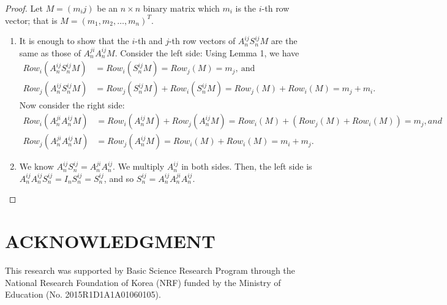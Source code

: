 \myprop*
\begin{proof}
Let $ M=(m_ij ) $ be an $ n\times n $ binary matrix which $ m_i $ is the $ i $-th row vector; that is $ M=(m_1,m_2,…,m_n )^T $.
\begin{enumerate}
	\item It is enough to show that the $ i $-th and $ j $-th row vectors of $ A_n^{ij} S_n^{ij} M $ are the same as those of $ A_n^{ji} A_n^{ij}  M $. Consider the left side: Using Lemma 1, we have 
	\begin{align*}
	Row_i (A_n^{ij} S_n^{ij} M)&=Row_i (S_n^{ij} M)=Row_j (M)=m_j,\ \text{and}\\
	Row_j (A_n^{ij} S_n^{ij} M)&=Row_j (S_n^{ij} M)+Row_i (S_n^{ij} M)=Row_j (M)+Row_i (M)=m_j+m_i .
	\end{align*}
	Now consider the right side:
	\begin{align*}
	Row_i (A_n^{ji} A_n^{ij} M)&=Row_i (A_n^{ij} M)+Row_j (A_n^{ij} M)=Row_i (M)+(Row_j (M)+Row_i (M))=m_j, and \\
	Row_j (A_n^{ji} A_n^{ij} M)&=Row_j (A_n^{ij} M)=Row_i (M)+Row_i (M) = m_i+m_j .
\end{align*}
	\item 	We know $ A_n^{ij} S_n^{ij} = A_n^{ji} A_n^{ij} $. We multiply $ A_n^{ij} $ in both sides. Then, the left side is $ A_n^{ij} A_n^{ij} S_n^{ij}=I_n S_n^{ij}=S_n^{ij} $, and so $ S_n^{ij}=A_n^{ij} A_n^{ji} A_n^{ij} $.
\end{enumerate}
\end{proof}

\section*{ACKNOWLEDGMENT}
This research was supported by Basic Science Research Program through the National Research Foundation of Korea (NRF) funded by the Ministry of Education (No. 2015R1D1A1A01060105).
